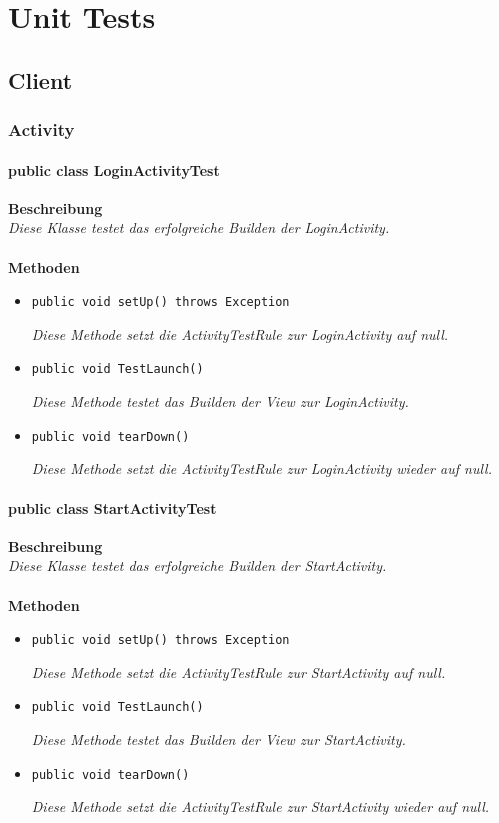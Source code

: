 \documentclass[a4paper]{scrreprt}
\begin{document}
	\chapter{Unit Tests}
	\section{Client}
	\subsection{Activity}
	\subsubsection{public class LoginActivityTest}
	\textbf{Beschreibung}\\
	\textit{Diese Klasse testet das erfolgreiche Builden der LoginActivity.}\\
	\\	
	\textbf{Methoden}
	\begin{itemize}
		
		\item\texttt{{public void setUp() throws Exception}}
		
		\textit{Diese Methode setzt die ActivityTestRule zur LoginActivity auf null.}
		
		\item\texttt{{public void TestLaunch()}}
		
		\textit{Diese Methode testet das Builden der View zur LoginActivity.}
		
		\item\texttt{{public void tearDown()}}
		
		\textit{Diese Methode setzt die ActivityTestRule zur LoginActivity wieder auf null.}
		
		
	\end{itemize}
	\subsubsection{public class StartActivityTest}
	\textbf{Beschreibung}\\
	\textit{Diese Klasse testet das erfolgreiche Builden der StartActivity.}\\
	\\	
	\textbf{Methoden}
	\begin{itemize}
		
		\item\texttt{{public void setUp() throws Exception}}
		
		\textit{Diese Methode setzt die ActivityTestRule zur StartActivity auf null.}
		
		\item\texttt{{public void TestLaunch()}}
		
		\textit{Diese Methode testet das Builden der View zur StartActivity.}
		
		\item\texttt{{public void tearDown()}}
		
		\textit{Diese Methode setzt die ActivityTestRule zur StartActivity wieder auf null.}
		
		
	\end{itemize}
\end{document}
